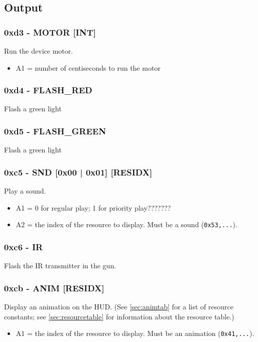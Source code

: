 \documentclass[12pt,a4paper]{scrbook}
\begin{document}
\subsection{Output}

\subsubsection{0xd3 - MOTOR [INT]}
Run the device motor.
\begin{itemize}
\item A1 = number of centiseconds to run the motor
\end{itemize}

\subsubsection{0xd4 - FLASH\_RED}
Flash a green light

\subsubsection{0xd5 - FLASH\_GREEN}
Flash a green light

\subsubsection{0xc5 - SND [0x00 | 0x01] [RESIDX] }
Play a sound.
\begin{itemize}
\item A1 = 0 for regular play; 1 for priority play???????
\item A2 = the index of the resource to display.  Must be a sound (\texttt{0x53,...}). 
\end{itemize}

\subsubsection{0xc6 - IR}
Flash the IR transmitter in the gun.

\subsubsection{0xcb - ANIM [RESIDX]}
Display an animation on the HUD.  (See \ref{sec:animtab} for a list of resource constants;
see \ref{sec:resourcetable} for information about the resource table.)
\begin{itemize}
\item A1 = the index of the resource to display.  Must be an animation (\texttt{0x41,...}).
\end{itemize}
\end{document}
